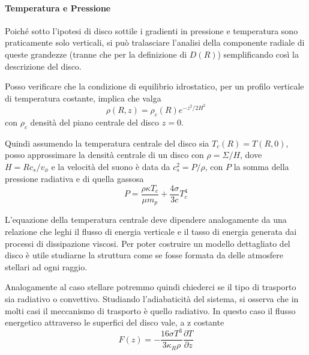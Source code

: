 \documentclass[a4paperbi]{article}
\begin{document}
	\paragraph{Temperatura e Pressione} Poiché sotto l'ipotesi di disco sottile i gradienti in pressione e temperatura sono praticamente solo verticali, si può tralasciare l'analisi della componente radiale di queste grandezze (tranne che per la definizione di $D(R)$) semplificando così la descrizione del disco.
	
	Posso verificare che la condizione di equilibrio idrostatico, per un profilo verticale di temperatura costante, implica che valga
	\begin{equation*}
		\rho(R,z)=\rho_c(R)e^{-z^2/2H^2}
	\end{equation*}
	con $\rho_c$ densità del piano centrale del disco $z=0$.
	
	Quindi assumendo la temperatura centrale del disco sia $T_c(R)=T(R,0)$, posso approssimare la densità centrale di un disco con $\rho=\Sigma/H$, dove $H=Rc_s/v_\phi$ e la velocità del suono è data da $c_s^2=P/\rho$, con $P$ la somma della pressione radiativa e di quella gassosa
	\begin{equation}
		P=\frac{\rho\kappa T_c}{\mu m_p}+\frac{4\sigma}{3c}T_c^4
	\end{equation}
	
	L'equazione della temperatura centrale deve dipendere analogamente da una relazione che leghi il flusso di energia verticale e il tasso di energia generata dai processi di dissipazione viscosi. Per poter costruire un modello dettagliato del disco è utile studiarne la struttura come se fosse formata da delle atmosfere stellari ad ogni raggio. 
	
	Analogamente al caso stellare potremmo quindi chiederci se il tipo di trasporto sia  radiativo o convettivo. Studiando l'adiabaticità del sistema, si osserva che in molti casi il meccanismo di trasporto è quello radiativo. In questo caso il flusso energetico attraverso le superfici del disco vale, a z costante
	\begin{equation}
		F(z)=-\frac{16\sigma T^3}{3\kappa_R\rho}\frac{\partial T}{\partial z}
	\end{equation}
	
\end{document}
